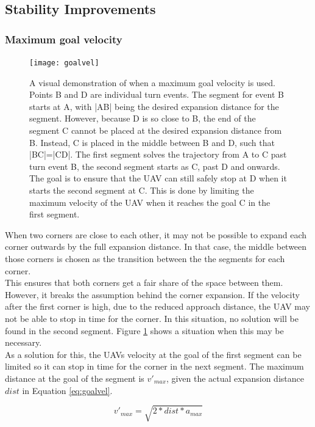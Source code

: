 \subsection{Stability Improvements}

\subsubsection{Maximum goal velocity}
\begin{figure}[]
	\centering
	\texttt{[image: goalvel]}
	\caption{A visual demonstration of when a maximum goal velocity is used. Points B and D are individual turn events. The segment for event B starts at A, with |AB| being the desired expansion distance for the segment. However, because D is so close to B, the end of the segment C cannot be placed at the desired expansion distance from B. Instead, C is placed in the middle between B and D, such that |BC|=|CD|. The first segment solves the trajectory from A to C past turn event B, the second segment starts as C, past D and onwards. The goal is to ensure that the UAV can still safely stop at D when it starts the second segment at C. This is done by limiting the maximum velocity of the UAV when it reaches the goal C in the first segment.}
	\label{fig:max-goal-vel}
\end{figure}

When two corners are close to each other, it may not be possible to expand each corner outwards by the full expansion distance. In that case, the middle between those corners is chosen as the transition between the the segments for each corner. \\
This ensures that both corners get a fair share of the space between them. However, it breaks the assumption behind the corner expansion. If the velocity after the first corner is high, due to the reduced approach distance, the UAV may not be able to stop in time for the corner. In this situation, no solution will be found in the second segment. Figure \ref{fig:max-goal-vel} shows a situation when this may be necessary.\\
As a solution for this, the UAVs velocity at the goal of the first segment can be limited so it can stop in time for the corner in the next segment. The maximum distance at the goal of the segment is $v'_{max}$, given the actual expansion distance $dist$ in Equation \ref{eq:goalvel}. 

\begin{equation}
\label{eq:goalvel}
v'_{max} = \sqrt{2 * dist * a_{max}}
\end{equation}

